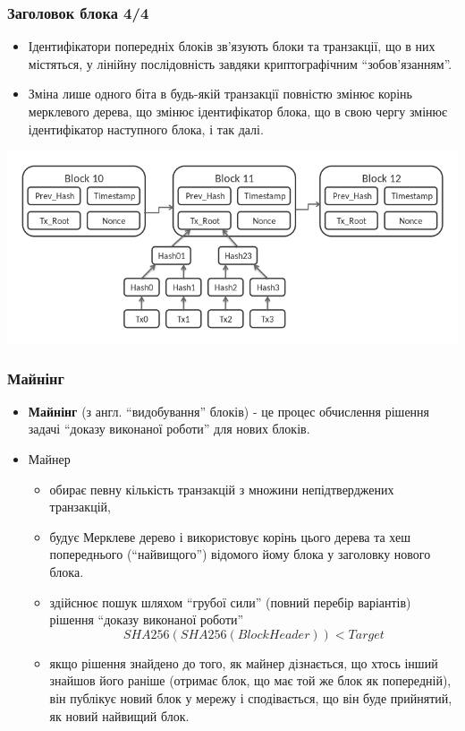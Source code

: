 \documentclass{beamer}
\begin{document}
\begin{frame}
  \frametitle{Заголовок блока 4/4}
  \begin{itemize}
  \item Ідентифікатори попередніх блоків зв'язують блоки та транзакції, що в них
    містяться, у лінійну послідовність завдяки криптографічним ``зобов'язанням''.
  \item Зміна лише одного біта в будь-якій транзакції повністю змінює корінь
    мерклевого дерева, що змінює ідентифікатор блока, що в свою чергу змінює
    ідентифікатор наступного блока, і так далі.
  \end{itemize}
  \includegraphics[width=\textwidth]{block-chain}
\end{frame}

\begin{frame}
  \frametitle{Майнінг}
  \begin{itemize}
  \item \textbf{Майнінг} (з англ. ``видобування'' блоків) - це процес обчислення
    рішення задачі ``доказу виконаної роботи'' для нових блоків.
  \item Майнер
    \begin{itemize}
    \item обирає певну кількість транзакцій з множини непідтверджених транзакцій,
    \item будує Мерклеве дерево і використовує корінь цього дерева та хеш
      попереднього (``найвищого'') відомого йому блока у заголовку нового блока.
    \item здійснює пошук шляхом ``грубої сили'' (повний перебір варіантів)
      рішення ``доказу виконаної роботи''
      $$SHA256(SHA256(BlockHeader)) < Target$$
    \item якщо рішення знайдено до того, як майнер дізнається, що хтось інший
      знайшов його раніше (отримає блок, що має той же блок як попередній),
      він публікує новий блок у мережу і сподівається, що він буде прийнятий, як
      новий найвищий блок.
    \end{itemize}
  \end{itemize}
\end{frame}
\end{document}

